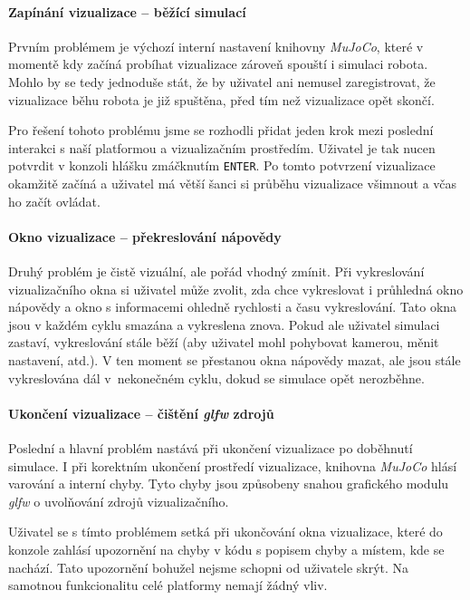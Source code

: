 \paragraph{Zapínání vizualizace -- běžící simulací}
Prvním problémem je výchozí interní nastavení knihovny \emph{MuJoCo}, které
v momentě kdy začíná probíhat vizualizace zároveň spouští i simulaci robota.
Mohlo by se tedy jednoduše stát, že by uživatel ani nemusel zaregistrovat, že
vizualizace běhu robota je již spuštěna, před tím než vizualizace opět skončí.

Pro řešení tohoto problému jsme se rozhodli přidat jeden krok mezi poslední
interakci s naší platformou a vizualizačním prostředím. Uživatel je tak nucen
potvrdit v konzoli hlášku zmáčknutím \texttt{ENTER}. Po tomto potvrzení
vizualizace okamžitě začíná a uživatel má větší šanci si průběhu vizualizace
všimnout a včas ho začít ovládat.

\paragraph{Okno vizualizace -- překreslování nápovědy}
Druhý problém je čistě vizuální, ale pořád vhodný zmínit. Při vykreslování
vizualizačního okna si uživatel může zvolit, zda chce vykreslovat i průhledná
okno nápovědy a okno s informacemi ohledně rychlosti a času vykreslování. Tato
okna jsou v každém cyklu smazána a vykreslena znova. Pokud ale uživatel
simulaci zastaví, vykreslování stále běží (aby uživatel mohl pohybovat kamerou,
měnit nastavení, atd.). V ten moment se přestanou okna nápovědy mazat, ale jsou
stále vykreslována dál v~nekonečném cyklu, dokud se simulace opět nerozběhne.

\paragraph{Ukončení vizualizace -- čištění \emph{glfw} zdrojů}
Poslední a hlavní problém nastává při ukončení vizualizace po doběhnutí
simulace. I při korektním ukončení prostředí vizualizace, knihovna
\emph{MuJoCo} hlásí varování a interní chyby. Tyto chyby jsou způsobeny snahou
grafického modulu \emph{glfw} o uvolňování zdrojů vizualizačního.

Uživatel se s tímto problémem setká při ukončování okna vizualizace, které do
konzole zahlásí upozornění na chyby v kódu s popisem chyby a místem, kde se
nachází. Tato upozornění bohužel nejsme schopni od uživatele skrýt. Na samotnou
funkcionalitu celé platformy nemají žádný vliv.


